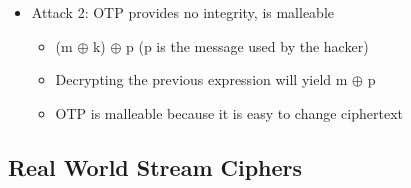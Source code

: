 \documentclass[]{article}
\begin{document}
\begin{itemize}
\begin{itemize}
\begin{itemize}
\begin{itemize}
			\end{itemize}
		\end{itemize}
	\end{itemize}
	\item Attack 2: OTP provides no integrity, is malleable
	\begin{itemize}
		\item (m $\oplus$ k) $\oplus$ p (p is the message used by the hacker)
		\item Decrypting the previous expression will yield m $\oplus$ p
		\item OTP is malleable because it is easy to change ciphertext
	\end{itemize}
\end{itemize}
\subsection{Real World Stream Ciphers}
\end{document}
